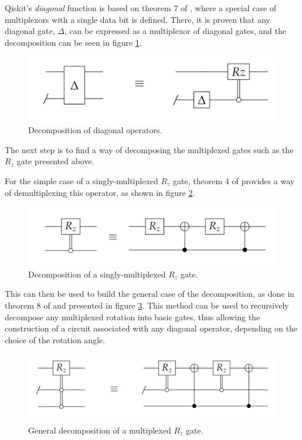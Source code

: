 \documentclass[../../../dissertation.tex]{subfiles}
\begin{document}
Qiskit's \textit{diagonal} function is based on theorem $7$ of \cite{shendel06},
where a special case of multiplexors with a single data bit is defined. There,
it is proven that any diagonal gate, $\Delta$, can be expressed as a
multiplexor of diagonal gates, and the decomposition can be seen in figure
\ref{fig:shendeDiagDecomp}. 
\begin{figure}[!h]
	\centering
	\includegraphics[scale=0.35]{img/QCircuit/diagonal/qcDelta.png}
	\caption{Decomposition of diagonal operators.} 
	\label{fig:shendeDiagDecomp}
\end{figure}
The next step is to find a way of decomposing the multiplexed gates such as the
$R_z$ gate presented above.\par

For the simple case of a singly-multiplexed $R_z$ gate, theorem 4 of
\cite{shendel06} provides a way of demultiplexing this operator, as shown in
figure \ref{fig:shendeSingleRz}.
\begin{figure}[!h]
	\centering
	\includegraphics[scale=0.35]{img/QCircuit/diagonal/qcSingDecomp.png}
	\caption{Decomposition of a singly-multiplexed $R_z$ gate.} 
	\label{fig:shendeSingleRz}
\end{figure}
This can then be used to build the general case of the decomposition, as done
in theorem 8 of \cite{shendel06} and presented in figure
\ref{fig:shendeGeneralRz}. This method can be used to recursively decompose any
multiplexed rotation into basic gates, thus allowing the construction of a
circuit associated with any diagonal operator, depending on the choice of the
rotation angle.
\begin{figure}[!h]
	\centering
	\includegraphics[scale=0.35]{img/QCircuit/diagonal/qcGenDecomp.png}
	\caption{General decomposition of a multiplexed $R_z$ gate.} 
	\label{fig:shendeGeneralRz}
\end{figure}\par
\end{document}
